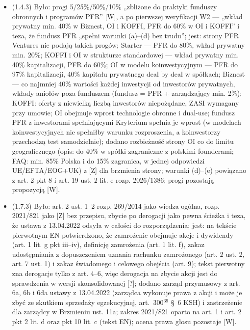 \documentclass[12pt,a4paper]{report}
\begin{document}
\begin{itemize}
  \item (1.4.3) Było: progi 5/25\%/50\%/10\% „zbliżone do praktyki funduszy obronnych i programów PFR” [W], a po pierwszej weryfikacji W2 — „wkład prywatny min. 40\% w Biznest, OI i KOFFI, PFR do 60\% w OI i KOFFI” i teza, że fundusz PFR „spełni warunki (a)–(d) bez trudu”; jest: strony PFR Ventures nie podają takich progów; Starter — PFR do 80\%, wkład prywatny min. 20\%; KOFFI i OI w strukturze standardowej — wkład prywatny min. 40\% kapitalizacji, PFR do 60\%; OI w modelu koinwestycyjnym — PFR do 97\% kapitalizacji, 40\% kapitału prywatnego deal by deal w spółkach; Biznest — co najmniej 40\% wartości każdej inwestycji od inwestorów prywatnych, wkłady aniołów poza funduszem (fundusz = PFR + zarządzający min. 2\%); KOFFI: oferty z niewielką liczbą inwestorów niepożądane, ZASI wymagany przy umowie; OI obejmuje wprost technologie obronne i dual-use; fundusz PFR z inwestorami spełniającymi Kryterium spełnia je wprost (w modelach koinwestycyjnych nie spełniłby warunku rozproszenia, a koinwestorzy przechodzą test samodzielnie); dodano rozbieżność strony OI co do limitu geograficznego (opis: do 40\% w spółki zagraniczne z polskimi founderami; FAQ: min. 85\% Polska i do 15\% zagranica, w jednej odpowiedzi UE/EFTA/EOG+UK) z [Z] dla brzmienia strony; warunki (d)–(e) powiązano z art. 2 pkt 8 i art. 19 ust. 2 lit. e rozp. 2026/1386; progi pozostają propozycją [W].
  \item (1.7.3) Było: art. 2 ust. 1–2 rozp. 269/2014 jako wiedza ogólna, rozp. 2021/821 jako [Z] bez przepisu, zbycie po derogacji jako pewna ścieżka i teza, że ustawa z 13.04.2022 odsyła w całości do rozporządzenia; jest: na tekście pierwotnym EN potwierdzono, że zamrożenie obejmuje akcje i dywidendy (art. 1 lit. g pkt iii–iv), definicję zamrożenia (art. 1 lit. f), zakaz udostępniania z dopuszczeniem uznania rachunku zamrożonego (art. 2 ust. 2, art. 7 ust. 1) i zakaz świadomego i celowego obejścia (art. 9); tekst pierwotny zna derogacje tylko z art. 4–6, więc derogacja na zbycie akcji jest do sprawdzenia w wersji skonsolidowanej [?]; dodano zarząd przymusowy z art. 6a, 6b i 6da ustawy z 13.04.2022 (zarządca wykonuje prawa z akcji i może je zbyć ze skutkiem sprzedaży egzekucyjnej, art.~300$^{39}$ §~6 KSH) i zastrzeżenie dla zarządcy w Brzmieniu ust. 11a; zakres 2021/821 oparto na art. 1 i art. 2 pkt 2 lit. d oraz pkt 10 lit. c (tekst EN); ocena prawa głosu pozostaje [W].

\end{itemize}
\end{document}
